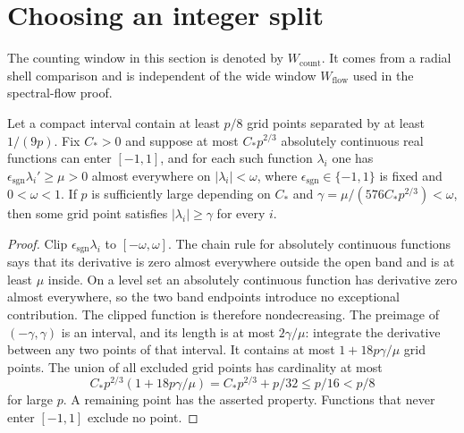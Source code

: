 \section{Choosing an integer split}\label{inf:sec-gap}

The counting window in this section is denoted by $W_{\mathrm{count}}$.
It comes from a radial shell comparison and is independent of the
wide window $W_{\mathrm{flow}}$ used in the spectral-flow proof.

\begin{lemma}
\label{inf:grid-avoidance}
Let a compact interval contain at least $p/8$ grid points separated
by at least $1/(9p)$. Fix $C_*>0$ and suppose at most
$C_*p^{2/3}$ absolutely
continuous real functions can enter $[-1,1]$, and for each such
function $\lambda_i$ one has
$\epsilon_{\mathrm{sgn}}\lambda_i'\ge\mu>0$ almost everywhere on
$|\lambda_i|<\omega$, where $\epsilon_{\mathrm{sgn}}\in\{-1,1\}$ is fixed
and $0<\omega<1$. If $p$ is sufficiently large depending on $C_*$
and $\gamma=\mu/(576C_*p^{2/3})<\omega$, then some grid point
satisfies $|\lambda_i|\ge\gamma$ for every $i$.
\end{lemma}
\begin{proof}
Clip $\epsilon_{\mathrm{sgn}}\lambda_i$ to $[-\omega,\omega]$.
The chain rule for absolutely continuous functions says that its
derivative is zero almost everywhere outside the open band and is
at least $\mu$ inside. On a level set an absolutely continuous
function has derivative zero almost everywhere, so the two band
endpoints introduce no exceptional contribution. The clipped
function is therefore nondecreasing. The preimage of
$(-\gamma,\gamma)$ is an interval, and its length is at most
$2\gamma/\mu$: integrate the derivative between any two points
of that interval. It contains at most $1+18p\gamma/\mu$ grid points.
The union of all excluded grid points has cardinality at most
\[
 C_*p^{2/3}(1+18p\gamma/\mu)
 =C_*p^{2/3}+p/32\le p/16<p/8
\]
for large $p$. A remaining point has the asserted property.
Functions that never enter $[-1,1]$ exclude no point.
\end{proof}

